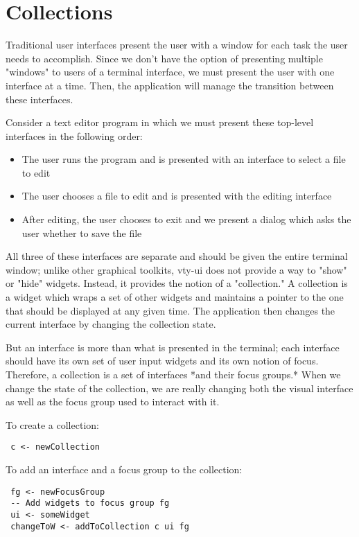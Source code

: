 \section{Collections}

Traditional user interfaces present the user with a window for each task
the user needs to accomplish.  Since we don't have the option of
presenting multiple "windows" to users of a terminal interface, we must
present the user with one interface at a time.  Then, the application
will manage the transition between these interfaces.

Consider a text editor program in which we must present these top-level
interfaces in the following order:

\begin{itemize}
\item The user runs the program and is presented with an interface to
      select a file to edit
\item The user chooses a file to edit and is presented with the
      editing interface
\item After editing, the user chooses to exit and we present a dialog
      which asks the user whether to save the file
\end{itemize}

All three of these interfaces are separate and should be given the
entire terminal window; unlike other graphical toolkits, vty-ui does not
provide a way to "show" or "hide" widgets.  Instead, it provides the
notion of a "collection."  A collection is a widget which wraps a set of
other widgets and maintains a pointer to the one that should be
displayed at any given time.  The application then changes the current
interface by changing the collection state.

But an interface is more than what is presented in the terminal; each
interface should have its own set of user input widgets and its own
notion of focus.  Therefore, a collection is a set of interfaces *and
their focus groups.*  When we change the state of the collection, we are
really changing both the visual interface as well as the focus group
used to interact with it.

To create a collection:

\begin{verbatim}
 c <- newCollection
\end{verbatim}

To add an interface and a focus group to the collection:

\begin{verbatim}
 fg <- newFocusGroup
 -- Add widgets to focus group fg
 ui <- someWidget
 changeToW <- addToCollection c ui fg
\end{verbatim}

